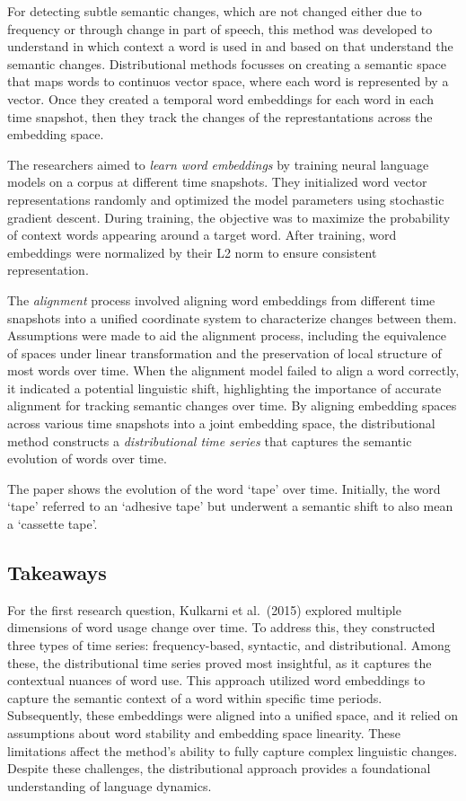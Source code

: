 For detecting subtle semantic changes, which are not changed either due to frequency or through change in part of speech,
this method was developed to understand in which context a word is used in and based on that understand the semantic changes.
Distributional methods focusses on creating a semantic space that maps words to continuos vector space, where each word is represented by a vector.
Once they created a temporal word embeddings for each word in each time snapshot, then they track the changes of the represtantations across the embedding space.

The researchers aimed to \emph{learn word embeddings} by training neural language models on a corpus at different time snapshots.
They initialized word vector representations randomly and optimized the model parameters using stochastic gradient descent.
During training, the objective was to maximize the probability of context words appearing around a target word.
After training, word embeddings were normalized by their L2 norm to ensure consistent representation.

The \emph{alignment} process involved aligning word embeddings from different time snapshots into a unified coordinate system to characterize changes between them.
Assumptions were made to aid the alignment process, including the equivalence of spaces under linear transformation and the preservation of local structure of most words over time.
When the alignment model failed to align a word correctly, it indicated a potential linguistic shift, highlighting the importance of accurate alignment for tracking semantic changes over time.
By aligning embedding spaces across various time snapshots into a joint embedding space,
the distributional method constructs a \emph{distributional time series} that captures the semantic evolution of words over time.

The paper shows the evolution of the word `tape' over time.
Initially, the word `tape' referred to an `adhesive tape' but underwent a semantic shift to also mean a `cassette tape'.

\subsection{Takeaways}\label{subsec:takeaways}
For the first research question, Kulkarni et al.\ (2015) explored multiple dimensions of word usage change over time.
To address this, they constructed three types of time series: frequency-based, syntactic, and distributional.
Among these, the distributional time series proved most insightful, as it captures the contextual nuances of word use.
This approach utilized word embeddings to capture the semantic context of a word within specific time periods.
Subsequently, these embeddings were aligned into a unified space,
and it relied on assumptions about word stability and embedding space linearity.
These limitations affect the method's ability to fully capture complex linguistic changes.
Despite these challenges, the distributional approach provides a foundational understanding of language dynamics.


